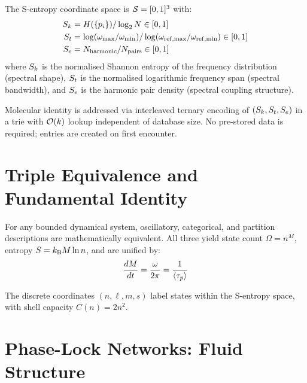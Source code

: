 \begin{definition}
\label{def:s_coords}
The S-entropy coordinate space is $\mathcal{S} = [0,1]^3$ with:
\begin{align}
    S_k &= H(\{p_i\}) / \log_2 N \in [0,1] \\
    S_t &= \log(\omega_{\max}/\omega_{\min}) / \log(\omega_{\mathrm{ref,max}}/\omega_{\mathrm{ref,min}}) \in [0,1] \\
    S_e &= N_{\mathrm{harmonic}} / N_{\mathrm{pairs}} \in [0,1]
\end{align}
where $S_k$ is the normalised Shannon entropy of the frequency distribution (spectral shape), $S_t$ is the normalised logarithmic frequency span (spectral bandwidth), and $S_e$ is the harmonic pair density (spectral coupling structure).
\end{definition}

\begin{definition}
\label{def:empty_dict}
Molecular identity is addressed via interleaved ternary encoding of $(S_k, S_t, S_e)$ in a trie with $\mathcal{O}(k)$ lookup independent of database size. No pre-stored data is required; entries are created on first encounter.
\end{definition}

\section{Triple Equivalence and Fundamental Identity}
\label{sec:triple}

\begin{theorem}
\label{thm:triple}
For any bounded dynamical system, oscillatory, categorical, and partition descriptions are mathematically equivalent. All three yield state count $\Omega = n^M$, entropy $S = k_{\mathrm{B}} M \ln n$, and are unified by:
\begin{equation}
\label{eq:fundamental}
    \frac{dM}{dt} = \frac{\omega}{2\pi} = \frac{1}{\langle\tau_p\rangle}
\end{equation}
\end{theorem}

\begin{definition}
The discrete coordinates $(n, \ell, m, s)$ label states within the S-entropy space, with shell capacity $C(n) = 2n^2$.
\end{definition}

\section{Phase-Lock Networks: Fluid Structure}
\label{sec:phase_lock}

